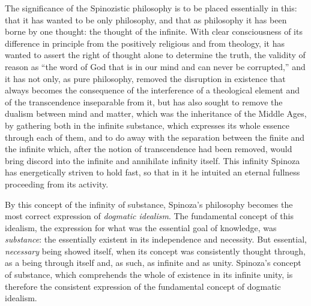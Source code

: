 The significance of the Spinozistic philosophy is to be placed
essentially in this: that it has wanted to be only philosophy, and that
as philosophy it has been borne by one thought: the thought of the
infinite. With clear consciousness of its difference in principle from
the positively religious and from theology, it has wanted to assert the
right of thought alone to determine the truth, the validity of reason
as ``the word of God that is in our mind and can never be corrupted,''
and it has not only, as pure philosophy, removed the disruption in
existence that always becomes the consequence of the interference of a
theological element and of the transcendence inseparable from it, but
has also sought to remove the dualism between mind and matter, which
was the inheritance of the Middle Ages, by gathering both in the
infinite substance, which expresses its whole essence through each of
them, and to do away with the separation between the finite and the
infinite which, after the notion of transcendence had been removed,
would bring discord into the infinite and annihilate infinity itself.
This infinity Spinoza has energetically striven to hold fast, so that
in it he intuited an eternal fullness proceeding from its activity.

By this concept of the infinity of substance, Spinoza's philosophy
becomes the most correct expression of \emph{dogmatic idealism}. The
fundamental concept of this idealism, the expression for what was the
essential goal of knowledge, was \emph{substance}: the essentially
existent in its independence and necessity. But essential,
\emph{necessary} being showed itself, when its concept was
consistently thought through, as a being through itself and, as such,
as infinite and as unity. Spinoza's concept of substance, which
comprehends the whole of existence in its infinite unity, is
therefore the consistent expression of the fundamental concept of
dogmatic idealism.

